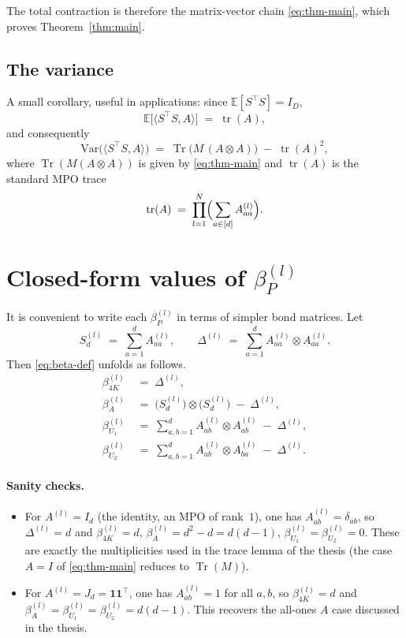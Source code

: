 \documentclass[11pt]{article}
\DeclareMathOperator{\Tr}{Tr}
\DeclareMathOperator{\tr}{tr}
\newcommand{\IE}{\mathbb{E}}
\begin{document}
The total contraction is therefore the matrix-vector chain
\eqref{eq:thm-main}, which proves Theorem~\ref{thm:main}.

\subsection{The variance}

A small corollary, useful in applications: since $\IE[S^\top S] = I_D$,
\[
\IE\bigl[\langle S^\top S, A\rangle\bigr] \;=\; \tr(A),
\]
and consequently
\begin{equation}\label{eq:variance}
\mathrm{Var}\bigl(\langle S^\top S, A\rangle\bigr)
\;=\;
\Tr\bigl(M\,(A\otimes A)\bigr)\;-\;\tr(A)^2,
\end{equation}
where $\Tr(M(A\otimes A))$ is given by \eqref{eq:thm-main} and $\tr(A)$
is the standard MPO trace
\[
\tr(A) \;=\; \prod_{l=1}^N\Bigl(\sum_{a\in[d]} A^{(l)}_{aa}\Bigr).
\]

\section{Closed-form values of $\beta_P^{(l)}$}\label{sec:beta-explicit}

It is convenient to write each $\beta_P^{(l)}$ in terms of simpler bond
matrices. Let
\[
S_d^{(l)} \;=\; \sum_{a=1}^d A^{(l)}_{aa},
\qquad
\Delta^{(l)} \;=\; \sum_{a=1}^d A^{(l)}_{aa}\otimes A^{(l)}_{aa}.
\]
Then \eqref{eq:beta-def} unfolds as follows.
\begin{align*}
\beta_{4K}^{(l)} \;&=\; \Delta^{(l)},\\
\beta_{A}^{(l)}  \;&=\; \bigl(S_d^{(l)}\bigr)\otimes\bigl(S_d^{(l)}\bigr) \;-\; \Delta^{(l)},\\
\beta_{U_1}^{(l)} \;&=\; \sum_{a,b=1}^{d} A^{(l)}_{ab}\otimes A^{(l)}_{ab} \;-\; \Delta^{(l)},\\
\beta_{U_2}^{(l)} \;&=\; \sum_{a,b=1}^{d} A^{(l)}_{ab}\otimes A^{(l)}_{ba} \;-\; \Delta^{(l)}.
\end{align*}

\paragraph{Sanity checks.}
\begin{itemize}
\item For $A^{(l)} = I_d$ (the identity, an MPO of rank~$1$), one has
$A^{(l)}_{ab} = \delta_{ab}$, so $\Delta^{(l)} = d$ and
$\beta_{4K}^{(l)} = d$, $\beta_A^{(l)} = d^2 - d = d(d-1)$,
$\beta_{U_1}^{(l)} = \beta_{U_2}^{(l)} = 0$. These are exactly the
multiplicities used in the trace lemma of the thesis (the case $A=I$
of \eqref{eq:thm-main} reduces to $\Tr(M)$).
\item For $A^{(l)} = J_d = \mathbf{1}\mathbf{1}^\top$, one has
$A^{(l)}_{ab} = 1$ for all $a,b$, so
$\beta_{4K}^{(l)} = d$ and
$\beta_A^{(l)} = \beta_{U_1}^{(l)} = \beta_{U_2}^{(l)} = d(d-1)$.
This recovers the all-ones $A$ case discussed in the thesis.
\end{itemize}
\end{document}
